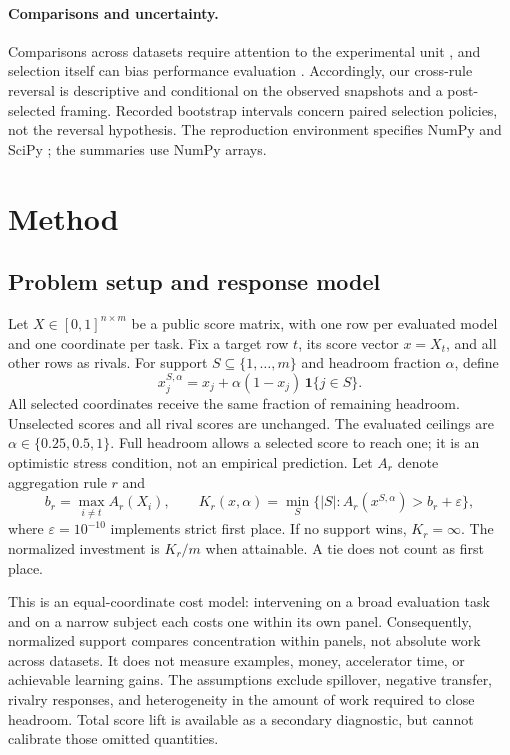 \documentclass{article}
\newcommand{\cost}{K}
\newcommand{\eps}{\varepsilon}
\begin{document}
\paragraph{Comparisons and uncertainty.}
Comparisons across datasets require attention to the experimental unit \citep{Demsar}, and selection itself can bias performance evaluation \citep{Cawley}. Accordingly, our cross-rule reversal is descriptive and conditional on the observed snapshots and a post-selected framing. Recorded bootstrap intervals \citep{Efron} concern paired selection policies, not the reversal hypothesis. The reproduction environment specifies NumPy and SciPy \citep{NumPy,SciPy}; the summaries use NumPy arrays.

\section{Method}
\subsection{Problem setup and response model}
Let $X\in[0,1]^{n\times m}$ be a public score matrix, with one row per evaluated model and one coordinate per task. Fix a target row $t$, its score vector $x=X_t$, and all other rows as rivals. For support $S\subseteq\{1,\ldots,m\}$ and headroom fraction $\alpha$, define
\begin{equation}
 x^{S,\alpha}_j=x_j+\alpha(1-x_j)\,\mathbf{1}\{j\in S\}.
 \label{eq:response}
\end{equation}
All selected coordinates receive the same fraction of remaining headroom. Unselected scores and all rival scores are unchanged. The evaluated ceilings are $\alpha\in\{0.25,0.5,1\}$. Full headroom allows a selected score to reach one; it is an optimistic stress condition, not an empirical prediction. Let $A_r$ denote aggregation rule $r$ and
\begin{equation}
 b_r=\max_{i\ne t} A_r(X_i),\qquad
 \cost_r(x,\alpha)=\min_S\{|S|:A_r(x^{S,\alpha})>b_r+\eps\},
 \label{eq:cost}
\end{equation}
where $\eps=10^{-10}$ implements strict first place. If no support wins, $\cost_r=\infty$. The normalized investment is $\cost_r/m$ when attainable. A tie does not count as first place.

This is an equal-coordinate cost model: intervening on a broad evaluation task and on a narrow subject each costs one within its own panel. Consequently, normalized support compares concentration within panels, not absolute work across datasets. It does not measure examples, money, accelerator time, or achievable learning gains. The assumptions exclude spillover, negative transfer, rivalry responses, and heterogeneity in the amount of work required to close headroom. Total score lift is available as a secondary diagnostic, but cannot calibrate those omitted quantities.
\end{document}
